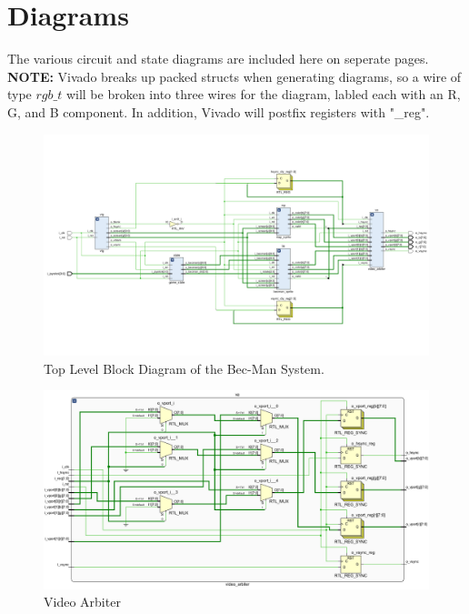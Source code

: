 \documentclass[12pt]{article}
\begin{document}
\newpage
\section{Diagrams}
The various circuit and state diagrams are included here on seperate pages. \\
\textbf{NOTE:} Vivado breaks up packed structs when generating diagrams, so a
wire of type $rgb\_t$ will be broken into three wires for the diagram, labled
each with an R, G, and B component. In addition, Vivado will postfix registers
with "\_reg".

\begin{figure}
    \includegraphics[width=\textwidth]{TopLevelDiagram.png}
    \caption{Top Level Block Diagram of the Bec-Man System.}
    \label{fig:LandscapeFigure}
\end{figure}

\begin{figure}
    \includegraphics[width=\textwidth]{VideoArbiter.png}
    \caption{Video Arbiter}
    \label{fig:LandscapeFigure}
\end{figure}
\end{document}
